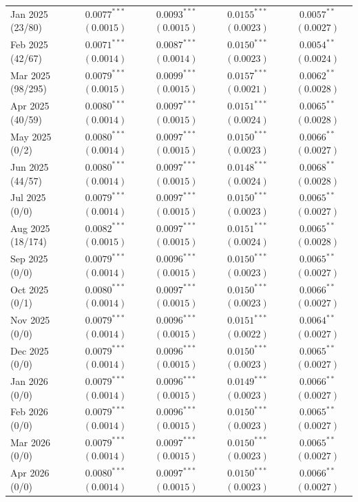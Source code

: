 \begin{tabular}{lcccc}
Jan 2025 (23/80) & $0.0077^{***}$ $(0.0015)$ & $0.0093^{***}$ $(0.0015)$ & $0.0155^{***}$ $(0.0023)$ & $0.0057^{**}$ $(0.0027)$ \\
Feb 2025 (42/67) & $0.0071^{***}$ $(0.0014)$ & $0.0087^{***}$ $(0.0014)$ & $0.0150^{***}$ $(0.0023)$ & $0.0054^{**}$ $(0.0024)$ \\
Mar 2025 (98/295) & $0.0079^{***}$ $(0.0015)$ & $0.0099^{***}$ $(0.0015)$ & $0.0157^{***}$ $(0.0021)$ & $0.0062^{**}$ $(0.0028)$ \\
Apr 2025 (40/59) & $0.0080^{***}$ $(0.0014)$ & $0.0097^{***}$ $(0.0015)$ & $0.0151^{***}$ $(0.0024)$ & $0.0065^{**}$ $(0.0028)$ \\
May 2025 (0/2) & $0.0080^{***}$ $(0.0014)$ & $0.0097^{***}$ $(0.0015)$ & $0.0150^{***}$ $(0.0023)$ & $0.0066^{**}$ $(0.0027)$ \\
Jun 2025 (44/57) & $0.0080^{***}$ $(0.0014)$ & $0.0097^{***}$ $(0.0015)$ & $0.0148^{***}$ $(0.0024)$ & $0.0068^{**}$ $(0.0028)$ \\
Jul 2025 (0/0) & $0.0079^{***}$ $(0.0014)$ & $0.0097^{***}$ $(0.0015)$ & $0.0150^{***}$ $(0.0023)$ & $0.0065^{**}$ $(0.0027)$ \\
Aug 2025 (18/174) & $0.0082^{***}$ $(0.0015)$ & $0.0097^{***}$ $(0.0015)$ & $0.0151^{***}$ $(0.0024)$ & $0.0065^{**}$ $(0.0028)$ \\
Sep 2025 (0/0) & $0.0079^{***}$ $(0.0014)$ & $0.0096^{***}$ $(0.0015)$ & $0.0150^{***}$ $(0.0023)$ & $0.0065^{**}$ $(0.0027)$ \\
Oct 2025 (0/1) & $0.0080^{***}$ $(0.0014)$ & $0.0097^{***}$ $(0.0015)$ & $0.0150^{***}$ $(0.0023)$ & $0.0066^{**}$ $(0.0027)$ \\
Nov 2025 (0/0) & $0.0079^{***}$ $(0.0014)$ & $0.0096^{***}$ $(0.0015)$ & $0.0151^{***}$ $(0.0022)$ & $0.0064^{**}$ $(0.0027)$ \\
Dec 2025 (0/0) & $0.0079^{***}$ $(0.0014)$ & $0.0096^{***}$ $(0.0015)$ & $0.0150^{***}$ $(0.0023)$ & $0.0065^{**}$ $(0.0027)$ \\
Jan 2026 (0/0) & $0.0079^{***}$ $(0.0014)$ & $0.0096^{***}$ $(0.0015)$ & $0.0149^{***}$ $(0.0023)$ & $0.0066^{**}$ $(0.0027)$ \\
Feb 2026 (0/0) & $0.0079^{***}$ $(0.0014)$ & $0.0096^{***}$ $(0.0015)$ & $0.0150^{***}$ $(0.0023)$ & $0.0065^{**}$ $(0.0027)$ \\
Mar 2026 (0/0) & $0.0079^{***}$ $(0.0014)$ & $0.0097^{***}$ $(0.0015)$ & $0.0150^{***}$ $(0.0023)$ & $0.0065^{**}$ $(0.0027)$ \\
Apr 2026 (0/0) & $0.0080^{***}$ $(0.0014)$ & $0.0097^{***}$ $(0.0015)$ & $0.0150^{***}$ $(0.0023)$ & $0.0066^{**}$ $(0.0027)$ \\

\end{tabular}
